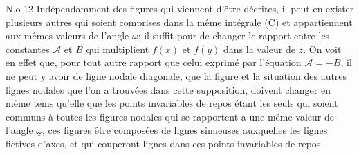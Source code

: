 \documentclass[11pt,a4paper]{article}
\begin{document}
N.o 12 Indépendamment des figures qui viennent d'être décrites,
il peut en exister plusieurs autres qui soient comprises dans
la même intégrale (C) et appartiennent aux mêmes valeurs
de l'angle $\underline{\omega}$; il suffit pour   de changer le rapport
entre les constantes $\mathcal{A}$ et $B$ qui multiplient $f(x)$ et $f(y)$
dans la valeur de $z$. On voit en effet que, pour tout
autre rapport que celui exprimé par l'équation $\mathcal{A} = -B$,
il ne peut y avoir de ligne nodale diagonale,   que 
la figure  et la situation des autres lignes nodales que
l'on a trouvées dans cette supposition, doivent changer en
même tems qu'elle  que les points invariables de repos  étant
les seuls qui soient communs à toutes les figures nodales qui
se rapportent a une même valeur de l'angle $\underline{\omega}$,  ces
figures   être composées de lignes sinueuses auxquelles
les lignes fictives   d'axes, et qui couperont  lignes
dans  ces points invariables de repos.
\end{document}
